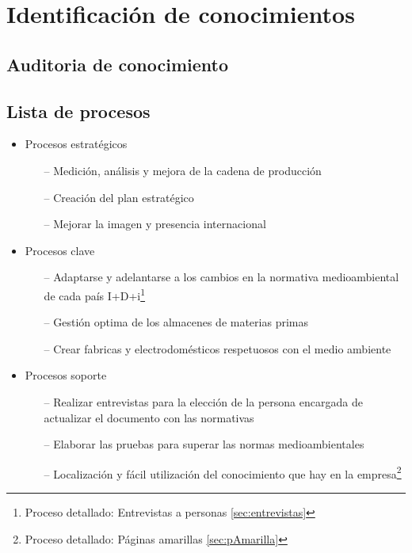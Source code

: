 \documentclass[a4paper]{article}
\begin{document}
\section{Identificación de conocimientos}

\subsection{Auditoria de conocimiento}


\subsection{Lista de procesos}

\begin{itemize}
	\item Procesos estratégicos
	\begin{itemize}
		\item[--] Medición, análisis y mejora de la cadena de producción
		\item[--] Creación del plan estratégico
		\item[--] Mejorar la imagen y presencia internacional
	\end{itemize}
	\item Procesos clave
	\begin{itemize}
		\item[--] Adaptarse y adelantarse a los cambios en la normativa medioambiental de cada país I+D+i\footnote{Proceso detallado: Entrevistas a personas \ref{sec:entrevistas}}
		\item[--] Gestión optima de los almacenes de materias primas
		\item[--] Crear fabricas y electrodomésticos respetuosos con el medio ambiente
	\end{itemize}
	\item Procesos soporte
	\begin{itemize}
		\item[--] Realizar entrevistas para la elección de la persona encargada de actualizar el documento con las normativas
		\item[--] Elaborar las pruebas para superar las normas medioambientales
		\item[--] Localización y fácil utilización del conocimiento que hay en la empresa\footnote{Proceso detallado: Páginas amarillas \ref{sec:pAmarilla}}
	\end{itemize}
\end{itemize}
\end{document}
